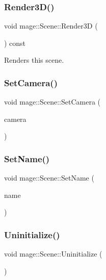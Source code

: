 \subsubsection{\texorpdfstring{Render3\+D()}{Render3D()}}
{\footnotesize\ttfamily void mage\+::\+Scene\+::\+Render3D (\begin{DoxyParamCaption}{ }\end{DoxyParamCaption}) const}

Renders this scene. \hypertarget{classmage_1_1_scene_a7568ec0884d04812af2f70990c8ec80d}{}\label{classmage_1_1_scene_a7568ec0884d04812af2f70990c8ec80d} 
\subsubsection{\texorpdfstring{Set\+Camera()}{SetCamera()}}
{\footnotesize\ttfamily void mage\+::\+Scene\+::\+Set\+Camera (\begin{DoxyParamCaption}\item[{\hyperlink{namespacemage_a1e01ae66713838a7a67d30e44c67703e}{Shared\+Ptr}$<$ \hyperlink{classmage_1_1_camera_node}{Camera\+Node} $>$}]{camera }\end{DoxyParamCaption})}

\hypertarget{classmage_1_1_scene_a9b7c1c2f84cc3b3c5ff3de4f29d830e9}{}\label{classmage_1_1_scene_a9b7c1c2f84cc3b3c5ff3de4f29d830e9} 
\subsubsection{\texorpdfstring{Set\+Name()}{SetName()}}
{\footnotesize\ttfamily void mage\+::\+Scene\+::\+Set\+Name (\begin{DoxyParamCaption}\item[{const string \&}]{name }\end{DoxyParamCaption})}

\hypertarget{classmage_1_1_scene_a714dc33c04dc2b8e2cec93564905b174}{}\label{classmage_1_1_scene_a714dc33c04dc2b8e2cec93564905b174} 
\subsubsection{\texorpdfstring{Uninitialize()}{Uninitialize()}}
{\footnotesize\ttfamily void mage\+::\+Scene\+::\+Uninitialize (\begin{DoxyParamCaption}{ }\end{DoxyParamCaption})}

